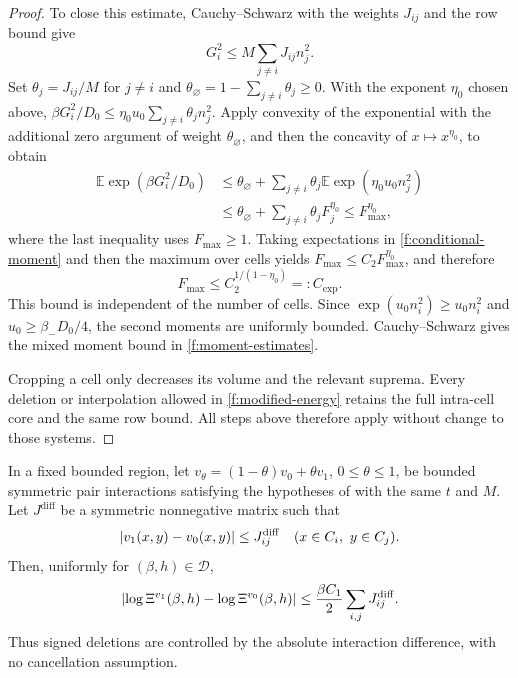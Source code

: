 \begin{proof}
To close this estimate, Cauchy--Schwarz with the weights $J_{ij}$
and the row bound give
\[
 G_i^2\le M\sum_{j\ne i}J_{ij}n_j^2.
\]
Set $\theta_j=J_{ij}/M$ for $j\ne i$ and
$\theta_\varnothing=1-\sum_{j\ne i}\theta_j\ge0$.
With the exponent $\eta_0$ chosen above,
$\beta G_i^2/D_0\le\eta_0u_0\sum_{j\ne i}\theta_jn_j^2$.
Apply convexity of the exponential with the additional zero argument
of weight $\theta_\varnothing$, and then the concavity of
$x\mapsto x^{\eta_0}$, to obtain
\[
 \begin{split}
 \mathbb E\exp(\beta G_i^2/D_0)
 &\le\theta_\varnothing+
       \sum_{j\ne i}\theta_j\mathbb E\exp(\eta_0u_0n_j^2)\\
 &\le\theta_\varnothing+\sum_{j\ne i}\theta_jF_j^{\eta_0}
 \le F_{\max}^{\eta_0},
 \end{split}
\]
where the last inequality uses $F_{\max}\ge1$.
Taking expectations in \eqref{f:conditional-moment} and then the
maximum over cells yields
$F_{\max}\le C_2F_{\max}^{\eta_0}$, and therefore
\[
 F_{\max}\le C_2^{1/(1-\eta_0)}=:C_{\exp}.
\]
This bound is independent of the number of cells.  Since
$\exp(u_0n_i^2)\ge u_0n_i^2$ and
$u_0\ge\beta_-D_0/4$, the second moments are uniformly bounded.
Cauchy--Schwarz gives the mixed moment bound in
\eqref{f:moment-estimates}.

Cropping a cell only decreases its volume and the relevant suprema.
Every deletion or interpolation allowed in \eqref{f:modified-energy}
retains the full intra-cell core and the same row bound.  All steps
above therefore apply without change to those systems.
\end{proof}

\begin{corollary}\label{f:perturbation}
In a fixed bounded region, let $v_\theta=(1-\theta)v_0+\theta v_1$,
$0\le\theta\le1$, be bounded symmetric pair interactions satisfying
the hypotheses of  with the same $t$ and $M$.
Let $J^{\mathrm{diff}}$ be a symmetric nonnegative matrix such that
\[
 \left|v_1(x,y)-v_0(x,y)\right|\le J^{\mathrm{diff}}_{ij}
 \quad (x\in C_i,\ y\in C_j).
\]
Then, uniformly for $(\beta,h)\in\mathcal D$,
\begin{equation}\label{f:interpolation-bound}
 \left|\log\Xi^{v_1}(\beta,h)-\log\Xi^{v_0}(\beta,h)\right|
 \le\frac{\beta C_1}{2}\sum_{i,j}J^{\mathrm{diff}}_{ij}.
\end{equation}
Thus signed deletions are controlled by the absolute interaction
difference, with no cancellation assumption.
\end{corollary}

